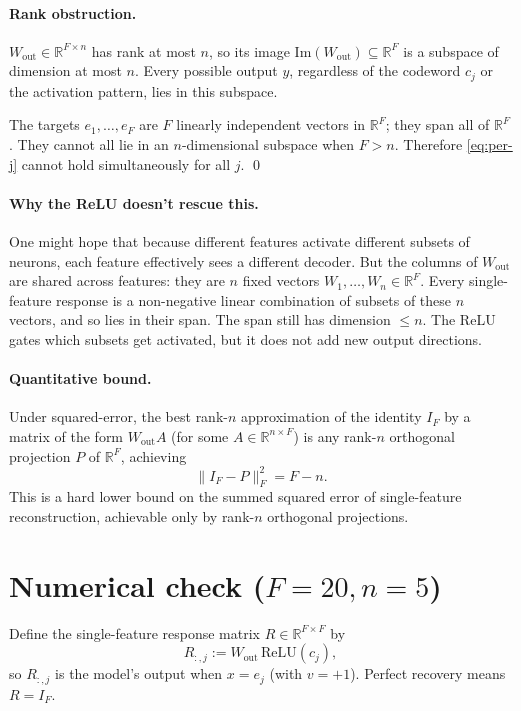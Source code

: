\documentclass[11pt]{article}
\begin{document}
\paragraph{Rank obstruction.}
$W_{\mathrm{out}} \in \mathbb{R}^{F \times n}$ has rank at most $n$, so its image $\mathrm{Im}(W_{\mathrm{out}}) \subseteq \mathbb{R}^F$ is a subspace of dimension at most $n$. Every possible output $y$, regardless of the codeword $c_j$ or the activation pattern, lies in this subspace.

The targets $e_1, \ldots, e_F$ are $F$ linearly independent vectors in $\mathbb{R}^F$; they span all of $\mathbb{R}^F$. They cannot all lie in an $n$-dimensional subspace when $F > n$. Therefore \eqref{eq:per-j} cannot hold simultaneously for all $j$. \qed

\paragraph{Why the ReLU doesn't rescue this.}
One might hope that because different features activate different subsets of neurons, each feature effectively sees a different decoder. But the columns of $W_{\mathrm{out}}$ are shared across features: they are $n$ fixed vectors $W_1, \ldots, W_n \in \mathbb{R}^F$. Every single-feature response is a non-negative linear combination of subsets of these $n$ vectors, and so lies in their span. The span still has dimension $\leq n$. The ReLU gates which subsets get activated, but it does not add new output directions.

\paragraph{Quantitative bound.}
Under squared-error, the best rank-$n$ approximation of the identity $I_F$ by a matrix of the form $W_{\mathrm{out}} A$ (for some $A \in \mathbb{R}^{n \times F}$) is any rank-$n$ orthogonal projection $P$ of $\mathbb{R}^F$, achieving
\begin{equation}
\|I_F - P\|_F^2 = F - n.
\end{equation}
This is a hard lower bound on the summed squared error of single-feature reconstruction, achievable only by rank-$n$ orthogonal projections.

\section{Numerical check ($F = 20, n = 5$)}

Define the single-feature response matrix $R \in \mathbb{R}^{F \times F}$ by
\begin{equation*}
R_{:, j} := W_{\mathrm{out}} \, \mathrm{ReLU}(c_j),
\end{equation*}
so $R_{:, j}$ is the model's output when $x = e_j$ (with $v = +1$). Perfect recovery means $R = I_F$.
\end{document}

